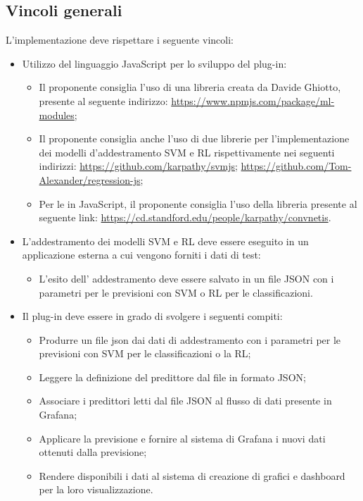 \documentclass[../analisi-dei-requisiti.tex]{subfiles}
\begin{document}
\subsection{Vincoli generali}
\label{subs:vincoli_generali}
	L'implementazione deve rispettare i seguente vincoli:
	\begin{itemize}
		\item{Utilizzo del linguaggio JavaScript per lo sviluppo del plug-in:}
		\begin{itemize}
			\item{Il proponente consiglia l'uso di una libreria creata da Davide Ghiotto, presente al seguente indirizzo:
			\newline \url{https://www.npmjs.com/package/ml-modules};}
			\item{Il proponente consiglia anche l'uso di due librerie per l'implementazione dei modelli d'addestramento SVM e RL rispettivamente nei seguenti indirizzi:
			\newline \url{https://github.com/karpathy/svmjs};
			\newline \url{https://github.com/Tom-Alexander/regression-js};}
			\item{Per le  in JavaScript, il proponente consiglia l'uso della libreria presente al seguente link:
			\newline \url{https://cd.standford.edu/people/karpathy/convnetis}.}
		\end{itemize}
		\item{L'addestramento dei modelli SVM e RL deve essere eseguito in un applicazione esterna a cui vengono forniti i dati di test:}
		\begin{itemize}
			\item{L'esito dell' addestramento deve essere salvato in un file JSON con i parametri per le previsioni con SVM o RL per le classificazioni.}
		\end{itemize}
	\item{Il plug-in deve essere in grado di svolgere i seguenti compiti:}
		\begin{itemize}
			\item{Produrre un file json dai dati di addestramento con i parametri per le previsioni con SVM per le classificazioni o la RL;}
			\item{Leggere la definizione del predittore dal file in formato JSON;}
			\item{Associare i predittori letti dal file JSON al flusso di dati presente in Grafana;}
			\item{Applicare la previsione e fornire al sistema di Grafana i nuovi dati ottenuti dalla previsione;}
			\item{Rendere disponibili i dati al sistema di creazione di grafici e dashboard per la loro visualizzazione.}
		\end{itemize}
	\end{itemize}
\end{document}
